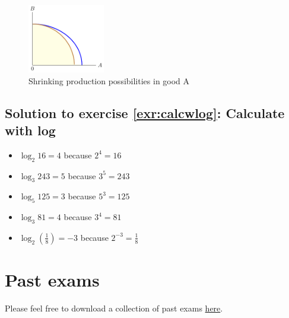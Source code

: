 \documentclass[
  12pt,
  oneside]{book}
\providecommand{\tightlist}{%
  \setlength{\itemsep}{0pt}\setlength{\parskip}{0pt}}
\theoremstyle{definition}
\theoremstyle{definition}
\theoremstyle{definition}
\theoremstyle{definition}
\theoremstyle{remark}
\begin{document}
\begin{figure}
\centering
\includegraphics[width=0.3\textwidth,height=\textheight]{fig/ppf4.png}
\caption{\label{fig:ppf4} Shrinking production possibilities in good A}
\end{figure}

\hypertarget{sol:calcwlog}{%
\subsection*{Solution to exercise \ref{exr:calcwlog}: Calculate with log}\label{sol:calcwlog}}

\begin{itemize}
\tightlist
\item
  \(\log_2 16=4\) because \(2^4=16\)
\item
  \(\log_3 243=5\) because \(3^5=243\)
\item
  \(\log_5 125=3\) because \(5^3=125\)
\item
  \(\log_3 81=4\) because \(3^4=81\)
\item
  \(\log_2 \left(\frac{1}{8}\right)=-3\) because \(2^{-3}=\frac{1}{8}\)
\end{itemize}

\hypertarget{pastexams}{%
\section{Past exams}\label{pastexams}}

Please feel free to download a collection of past exams \href{https://raw.githubusercontent.com/hubchev/hubchev.github.io/main/meco/pdfs/pexam_me.pdf}{here}.

  
\end{document}
